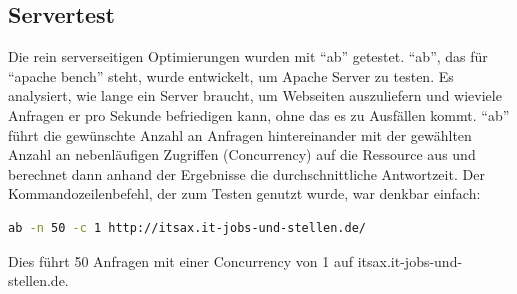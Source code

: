 \subsection{Servertest}
Die rein serverseitigen Optimierungen wurden mit "`ab"' getestet. "`ab"', das für "`apache bench"' steht, wurde entwickelt, um Apache Server zu testen. Es analysiert, wie lange ein Server braucht, um Webseiten auszuliefern und wieviele Anfragen er pro Sekunde befriedigen kann, ohne das es zu Ausfällen kommt. "`ab"' führt die gewünschte Anzahl an Anfragen hintereinander mit der gewählten Anzahl an nebenläufigen Zugriffen (Concurrency) auf die Ressource aus und berechnet dann anhand der Ergebnisse die durchschnittliche Antwortzeit. Der Kommandozeilenbefehl, der zum Testen genutzt wurde, war denkbar einfach:
\begin{lstlisting}[language=bash,label=ab mit Parametern,caption=ab mit Parametern]
ab -n 50 -c 1 http://itsax.it-jobs-und-stellen.de/
\end{lstlisting}
Dies führt 50 Anfragen mit einer Concurrency von 1 auf itsax.it-jobs-und-stellen.de.

